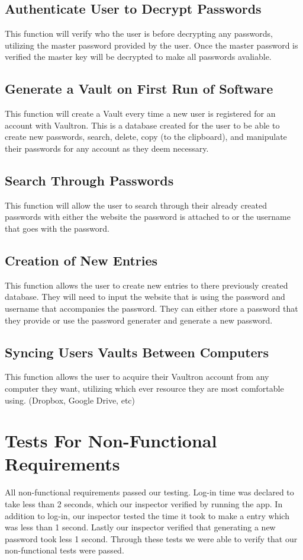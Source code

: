 \documentclass[11pt]{report}
\begin{document}
\subsection{Authenticate User to Decrypt Passwords}
This function will verify who the user is before decrypting any passwords, utilizing 
the master password provided by the user. Once the master password is verified
the master key will be decrypted to make all passwords avaliable.

\subsection{Generate a Vault on First Run of Software}
This function will create a Vault every time a new user is registered for an account 
with Vaultron. This is a database created for the user to be able to create new
passwords, search, delete, copy (to the clipboard), and manipulate their passwords
for any account as they deem necessary.

\subsection{Search Through Passwords}
This function will allow the user to search through their already created passwords
with either the website the password is attached to or the username that goes with 
the password. 

\subsection{Creation of New Entries}
This function allows the user to create new entries to there previously created 
database. They will need to input the website that is using the password and
username that accompanies the password.  They can either store a password that
they provide or use the password generater and generate a new password.

\subsection{Syncing Users Vaults Between Computers}
This function allows the user to acquire their Vaultron account from any computer 
they want, utilizing which ever resource they are most comfortable using. (Dropbox, 
Google Drive, etc)



\section{Tests For Non-Functional Requirements}
All non-functional requirements passed our testing. Log-in time was declared to 
take less than 2 seconds, which our inspector verified by running the app. In 
addition to log-in, our inspector tested the time it took to make a entry which 
was less than 1 second. Lastly our inspector verified that generating a new 
password took less 1 second. Through these tests we were able to verify that our 
non-functional tests were passed.
\end{document}
